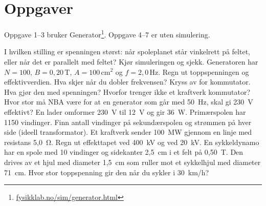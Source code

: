 \documentclass[11pt]{article}
\begin{document}

\section*{Oppgaver}

Oppgave 1–3 bruker Generator\footnote{\url{fysikklab.no/sim/generator.html}}. Oppgave 4–7 er uten simulering.

\begin{oppgaveliste}
\oppgave {}I hvilken stilling er spenningen størst: når spoleplanet står vinkelrett på feltet, eller når det er parallelt med feltet? Kjør simuleringen og sjekk.
\svar
\oppgave {}Generatoren har $N = 100$, $B = 0{,}20\,\mathrm{T}$, $A = 100\,\mathrm{cm^{2}}$ og $f = 2{,}0\,\mathrm{Hz}$. Regn ut toppspenningen og effektivverdien. Hva skjer når du dobler frekvensen?
\svar
\oppgave {}Kryss av for kommutator. Hva gjør den med spenningen? Hvorfor trenger ikke et kraftverk kommutator?
\svar
\oppgave {}Hvor stor må NBA være for at en generator som går med 50~Hz, skal gi 230~V effektivt?
\svar
\oppgave {}En lader omformer 230~V til 12~V og gir 36~W. Primærspolen har 1150 vindinger. Finn antall vindinger på sekundærspolen og strømmen på hver side (ideell transformator).
\svar
\oppgave {}Et kraftverk sender 100~MW gjennom en linje med resistans 5,0~Ω. Regn ut effekttapet ved 400~kV og ved 20~kV.
\svar
\oppgave {}En sykkeldynamo har en spole med 10 vindinger og sidekanter 2,5~cm i et felt på 0,50~T. Den drives av et hjul med diameter 1,5~cm som ruller mot et sykkelhjul med diameter 71~cm. Hvor stor toppspenning gir den når du sykler i 30~km/h?
\svar
\end{oppgaveliste}
\end{document}
